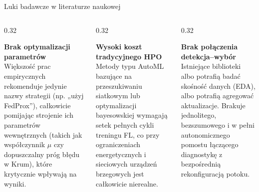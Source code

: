 \documentclass[9pt,aspectratio=169]{beamer}
\begin{document}
\begin{frame}{Luki badawcze w literaturze naukowej}
\begin{columns}[T]
\begin{column}{0.32\textwidth}
\begin{cardpurple}
\textbf{Brak optymalizacji parametrów}\\[4pt]
\footnotesize Większość prac empirycznych rekomenduje jedynie nazwy strategii (np. „użyj FedProx”), całkowicie pomijając strojenie ich parametrów wewnętrznych (takich jak współczynnik $\mu$ czy dopuszczalny próg błędu w Krum), które krytycznie wpływają na wyniki.
\end{cardpurple}
\end{column}
\begin{column}{0.32\textwidth}
\begin{cardgreen}
\textbf{Wysoki koszt tradycyjnego HPO}\\[4pt]
\footnotesize Metody typu AutoML bazujące na przeszukiwaniu siatkowym lub optymalizacji bayesowskiej wymagają setek pełnych cykli treningu FL, co przy ograniczeniach energetycznych i sieciowych urządzeń brzegowych jest całkowicie nierealne.
\end{cardgreen}
\end{column}
\begin{column}{0.32\textwidth}
\begin{cardorange}
\textbf{Brak połączenia detekcja--wybór}\\[4pt]
\footnotesize Istniejące biblioteki albo potrafią badać skośność danych (EDA), albo potrafią agregować aktualizacje. Brakuje jednolitego, bezszumowego i w pełni autonomicznego pomostu łączącego diagnostykę z bezpośrednią rekonfiguracją potoku.
\end{cardorange}
\end{column}
\end{columns}
\end{frame}
\end{document}
